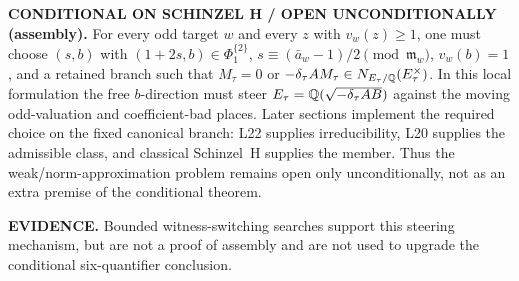 \textbf{CONDITIONAL ON SCHINZEL H / OPEN UNCONDITIONALLY (assembly).}
For every odd target $w$ and every $z$ with $v_w(z)\geq1$, one must choose
$(s,b)$ with $(1+2s,b)\in\Phi_1^{\{2\}}$,
$s\equiv(\bar a_w-1)/2\pmod{\mathfrak m_w}$, $v_w(b)=1$, and a retained
branch such that
$M_\tau=0$ or
$-\delta_\tau A M_\tau\in N_{E_\tau/\mathbb{Q}}(E_\tau^\times)$.
In this local formulation the free $b$-direction must steer
$E_\tau=\mathbb{Q}(\sqrt{-\delta_\tau AB})$ against the moving odd-valuation and
coefficient-bad places.  Later sections implement the required choice on
the fixed canonical branch: L22 supplies irreducibility, L20 supplies the
admissible class, and classical Schinzel~H supplies the member.  Thus the
weak/norm-approximation problem remains open only unconditionally, not as
an extra premise of the conditional theorem.

\textbf{EVIDENCE.}
Bounded witness-switching searches support this steering mechanism, but
are not a proof of assembly and are not used to upgrade the conditional
six-quantifier conclusion.
